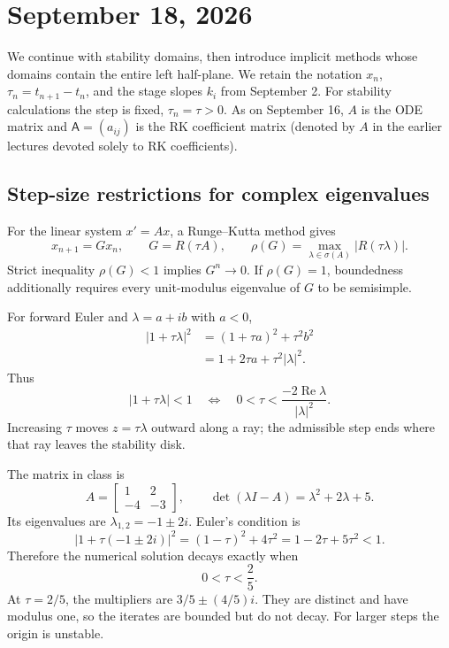 \section{September 18, 2026}

We continue with stability domains, then introduce implicit methods
whose domains contain the entire left half-plane. We retain the
notation \(x_n\), \(\tau_n=t_{n+1}-t_n\), and the stage slopes \(k_i\)
from September 2. For stability calculations the step is fixed,
\(\tau_n=\tau>0\). As on September 16, \(A\) is the ODE matrix and
\(\mathsf A=(a_{ij})\) is the RK coefficient matrix (denoted by \(A\)
in the earlier lectures devoted solely to RK coefficients).

\subsection{Step-size restrictions for complex eigenvalues}

For the linear system \(x'=Ax\), a Runge--Kutta method gives
\[
 x_{n+1}=Gx_n,\qquad G=R(\tau A),
 \qquad \rho(G)=\max_{\lambda\in\sigma(A)}|R(\tau\lambda)|.
\]
Strict inequality \(\rho(G)<1\) implies \(G^n\to0\). If
\(\rho(G)=1\), boundedness additionally requires every unit-modulus
eigenvalue of \(G\) to be semisimple.

For forward Euler and \(\lambda=a+ib\) with \(a<0\),
\begin{align*}
 |1+\tau\lambda|^2
  &=(1+\tau a)^2+\tau^2b^2\\
  &=1+2\tau a+\tau^2|\lambda|^2.
\end{align*}
Thus
\begin{equation}\label{eq:euler-complex-bound-sep-18}
 |1+\tau\lambda|<1
 \quad\Longleftrightarrow\quad
 0<\tau<\frac{-2\operatorname{Re}\lambda}{|\lambda|^2}.
\end{equation}
Increasing \(\tau\) moves \(z=\tau\lambda\) outward along a ray;
the admissible step ends where that ray leaves the stability disk.

\begin{example}
 The matrix in class is
 \[
  A=\begin{bmatrix}1&2\\-4&-3\end{bmatrix},
  \qquad \det(\lambda I-A)=\lambda^2+2\lambda+5.
 \]
 Its eigenvalues are \(\lambda_{1,2}=-1\pm2i\). Euler's condition is
 \[
  |1+\tau(-1\pm2i)|^2
    =(1-\tau)^2+4\tau^2
    =1-2\tau+5\tau^2<1.
 \]
 Therefore the numerical solution decays exactly when
 \[
  \boxed{0<\tau<\frac25.}
 \]
 At \(\tau=2/5\), the multipliers are \(3/5\pm(4/5)i\).
 They are distinct and have modulus one, so the iterates are bounded
 but do not decay. For larger steps the origin is unstable.
\end{example}

